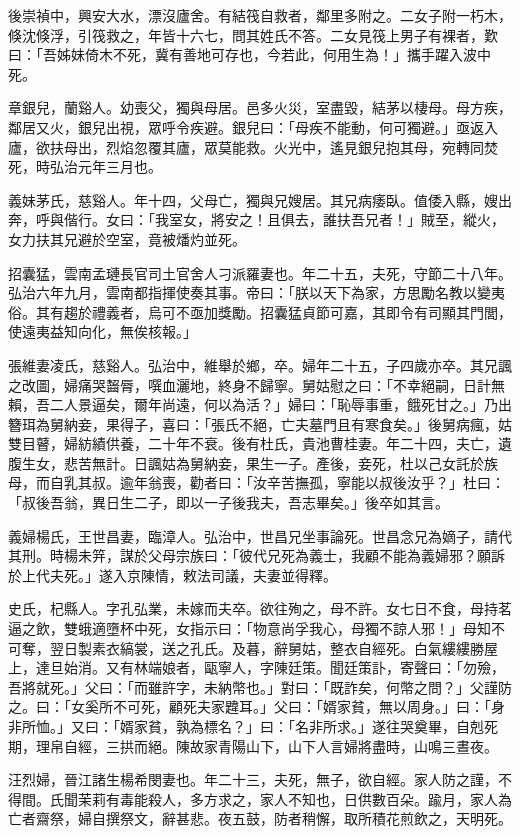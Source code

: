 \begin{pinyinscope}
後崇禎中，興安大水，漂沒廬舍。有結筏自救者，鄰里多附之。二女子附一朽木，倏沈倏浮，引筏救之，年皆十六七，問其姓氏不答。二女見筏上男子有裸者，歎曰：「吾姊妹倚木不死，冀有善地可存也，今若此，何用生為！」攜手躍入波中死。

章銀兒，蘭谿人。幼喪父，獨與母居。邑多火災，室盡毀，結茅以棲母。母方疾，鄰居又火，銀兒出視，眾呼令疾避。銀兒曰：「母疾不能動，何可獨避。」亟返入廬，欲扶母出，烈焰忽覆其廬，眾莫能救。火光中，遙見銀兒抱其母，宛轉同焚死，時弘治元年三月也。

義妹茅氏，慈谿人。年十四，父母亡，獨與兄嫂居。其兄病痿臥。值倭入縣，嫂出奔，呼與偕行。女曰：「我室女，將安之！且俱去，誰扶吾兄者！」賊至，縱火，女力扶其兄避於空室，竟被燔灼並死。

招囊猛，雲南孟璉長官司土官舍人刁派羅妻也。年二十五，夫死，守節二十八年。弘治六年九月，雲南都指揮使奏其事。帝曰：「朕以天下為家，方思勵名教以變夷俗。其有趨於禮義者，烏可不亟加獎勵。招囊猛貞節可嘉，其即令有司顯其門閭，使遠夷益知向化，無俟核報。」

張維妻凌氏，慈谿人。弘治中，維舉於鄉，卒。婦年二十五，子四歲亦卒。其兄諷之改圖，婦痛哭齧脣，噀血灑地，終身不歸寧。舅姑慰之曰：「不幸絕嗣，日計無賴，吾二人景逼矣，爾年尚遠，何以為活？」婦曰：「恥辱事重，餓死甘之。」乃出簪珥為舅納妾，果得子，喜曰：「張氏不絕，亡夫墓門且有寒食矣。」後舅病瘋，姑雙目瞽，婦紡績供養，二十年不衰。後有杜氏，貴池曹桂妻。年二十四，夫亡，遺腹生女，悲苦無計。日諷姑為舅納妾，果生一子。產後，妾死，杜以己女託於族母，而自乳其叔。逾年翁喪，勸者曰：「汝辛苦撫孤，寧能以叔後汝乎？」杜曰：「叔後吾翁，異日生二子，即以一子後我夫，吾志畢矣。」後卒如其言。

義婦楊氏，王世昌妻，臨漳人。弘治中，世昌兄坐事論死。世昌念兄為嫡子，請代其刑。時楊未笄，謀於父母宗族曰：「彼代兄死為義士，我顧不能為義婦邪？願訴於上代夫死。」遂入京陳情，敕法司議，夫妻並得釋。

史氏，杞縣人。字孔弘業，未嫁而夫卒。欲往殉之，母不許。女七日不食，母持茗逼之飲，雙蛾適墮杯中死，女指示曰：「物意尚孚我心，母獨不諒人邪！」母知不可奪，翌日製素衣縞裳，送之孔氏。及暮，辭舅姑，整衣自經死。白氣縷縷勝屋上，達旦始消。又有林端娘者，甌寧人，字陳廷策。聞廷策訃，寄聲曰：「勿殮，吾將就死。」父曰：「而雖許字，未納幣也。」對曰：「既詐矣，何幣之問？」父謹防之。曰：「女奚所不可死，顧死夫家韙耳。」父曰：「婿家貧，無以周身。」曰：「身非所恤。」又曰：「婿家貧，孰為標名？」曰：「名非所求。」遂往哭奠畢，自剋死期，理帛自經，三拱而絕。陳故家青陽山下，山下人言婦將盡時，山鳴三晝夜。

汪烈婦，晉江諸生楊希閔妻也。年二十三，夫死，無子，欲自經。家人防之謹，不得間。氏聞茉莉有毒能殺人，多方求之，家人不知也，日供數百朵。踰月，家人為亡者齋祭，婦自撰祭文，辭甚悲。夜五鼓，防者稍懈，取所積花煎飲之，天明死。


\end{pinyinscope}
